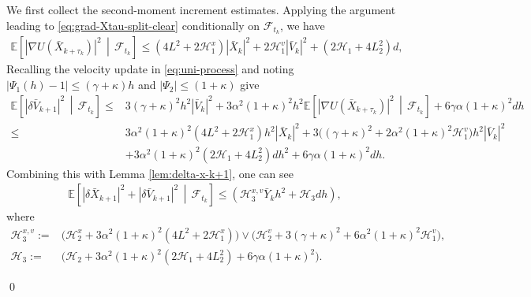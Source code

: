 \documentclass[12pt]{article}
\newenvironment{redtext}
  {\color{black}\ignorespaces}
  {\ignorespacesafterend}
\numberwithin{equation}{section}
\renewenvironment{proof}%
  {\begin{trivlist}%
   \item[]\ignorespaces}%
  {\qed\end{trivlist}}
\renewcommand{\H}{\mathcal{H}}
\begin{document}
\begin{redtext}
\begin{proof}
We first collect the second-moment increment estimates. %
%
Applying the argument leading to \eqref{eq:grad-Xtau-split-clear} conditionally on \(\mathcal F_{t_k}\),
we have
\begin{align}
\mathbb E
\left[
\left|
\nabla U(\bar X_{k+\tau_k})
\right|^2
\,\middle|\,
\mathcal F_{t_k}
\right]
\leq
(4L^2+2\H_1^x)|\bar X_k|^2
+
2\H_1^v|\bar V_k|^2
+
(2\H_1+4L_2^2)d,
\label{eq:conditional-gradient-second-fourth}
\end{align}
Recalling the velocity update in \eqref{eq:uni-process} and noting
\(|\Psi_1(h)-1|\leq(\gamma+\kappa)h\) and 
\(|\Psi_2|\le (1+\kappa)
\)
give
\begin{align}
\mathbb E
\left[
\left|
\delta \bar V_{k+1}
\right|^2
\,\middle|\,
\mathcal F_{t_k}
\right]
\leq&
3(\gamma+\kappa)^2h^2|\bar V_k|^2
+
3\alpha^2(1+\kappa)^2h^2
\mathbb E
\left[
\left|
\nabla U(\bar X_{k+\tau_k})
\right|^2
\,\middle|\,
\mathcal F_{t_k}
\right]
+
6\gamma\alpha(1+\kappa)^2dh
\nonumber
\\ 
\leq  &
3\alpha^2(1+\kappa)^2
(4L^2+2\mathcal H_1^x)
h^2|\bar X_k|^2
+
3\Big(
(\gamma+\kappa)^2
+
2\alpha^2(1+\kappa)^2\mathcal H_1^v
\Big)
h^2|\bar V_k|^2
\nonumber\\
&+
3\alpha^2(1+\kappa)^2
(2\mathcal H_1+4L_2^2)
d h^2
+
6\gamma\alpha(1+\kappa)^2dh.
\end{align}
Combining this with Lemma \ref{lem:delta-x-k+1}, one can see
\begin{equation}
\label{eq:full-increment-second-fourth}
\begin{aligned}
\mathbb E
\left[
\left|
\delta  \bar X_{k+1}
\right|^2
+
\left|
\delta  \bar V_{k+1}
\right|^2
\,\middle|\,
\mathcal F_{t_k}
\right]\leq
\left(
\H_3^{x,v} 
\bar Y_k
h^2
+
\H_3 
dh
\right),
\end{aligned}
\end{equation}
where 
\begin{equation}
\label{eq:con-mathcal-H-3}
\begin{aligned}
\H_3^{x,v} 
:=&
\big(
\H_2^x
+
3\alpha^2(1+\kappa)^2
(4L^2+2\H_1^x)
\big)
\vee
\big(
\H_2^v
+
3(\gamma+\kappa)^2
+
6\alpha^2(1+\kappa)^2\H_1^v
\big),
\\
\H_3:=
&
\big(
\H_2
+
3\alpha^2(1+\kappa)^2
(2\H_1+4L_2^2)
+
6\gamma\alpha(1+\kappa)^2
\big).
\end{aligned}
\end{equation}



\end{proof}
\end{redtext}
\end{document}
